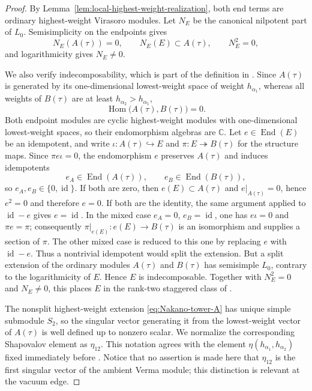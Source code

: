 \documentclass[12pt,leqno]{amsart}
\numberwithin{equation}{section}
\newcommand{\End}{\operatorname{End}}
\newcommand{\Hom}{\operatorname{Hom}}
\newcommand{\id}{\operatorname{id}}
\def\C{\mathbb{C}}
\begin{document}
\begin{proof}
By Lemma~\ref{lem:local-highest-weight-realization}, both end terms are
ordinary highest-weight Virasoro modules.  Let $N_E$ be the canonical
nilpotent part of $L_0$.  Semisimplicity on the endpoints gives
\[
 N_E(A(\tau))=0,\qquad
 N_E(E)\subset A(\tau),\qquad N_E^2=0,
\]
and logarithmicity gives $N_E\ne0$.

We also verify indecomposability, which is part of the definition in
\cite[Section~3]{KytolaRidout}.  Since $A(\tau)$ is generated by its
one-dimensional lowest-weight space of weight $h_{\alpha_1}$, whereas
all weights of $B(\tau)$ are at least $h_{\alpha_2}>h_{\alpha_1}$,
\[
 \Hom\bigl(A(\tau),B(\tau)\bigr)=0.
\]
Both endpoint modules are cyclic highest-weight modules with
one-dimensional lowest-weight spaces, so their endomorphism algebras are
$\C$.  Let $e\in\End(E)$ be an idempotent, and write
$\iota:A(\tau)\hookrightarrow E$ and
$\pi:E\twoheadrightarrow B(\tau)$ for the structure maps.  Since
$\pi e\iota=0$, the endomorphism $e$ preserves $A(\tau)$ and induces
idempotents
\[
 e_A\in\End(A(\tau)),\qquad e_B\in\End(B(\tau)),
\]
so $e_A,e_B\in\{0,\id\}$.  If both are zero, then
$e(E)\subset A(\tau)$ and $e|_{A(\tau)}=0$, hence $e^2=0$ and therefore
$e=0$.  If both are the identity, the same argument applied to $\id-e$
gives $e=\id$.  In the mixed case $e_A=0$, $e_B=\id$, one has
$e\iota=0$ and $\pi e=\pi$; consequently
$\pi|_{e(E)}:e(E)\to B(\tau)$ is an isomorphism and supplies a section of
$\pi$.  The other mixed case is reduced to this one by replacing $e$
with $\id-e$.  Thus a nontrivial idempotent would split the extension.
But a split extension of the ordinary modules $A(\tau)$ and $B(\tau)$
has semisimple $L_0$, contrary to the logarithmicity of $E$.  Hence $E$
is indecomposable.  Together with $N_E^2=0$ and $N_E\ne0$, this places
$E$ in the rank-two staggered class of \cite{KytolaRidout}.

The nonsplit highest-weight extension
\eqref{eq:Nakano-tower-A} has unique simple submodule $S_2$, so the
singular vector generating it from the lowest-weight vector of
$A(\tau)$ is well defined up to nonzero scalar.  We normalize the
corresponding Shapovalov element as $\eta_{12}$.  This notation agrees
with the element $\eta(h_{\alpha_1},h_{\alpha_2})$ fixed immediately
before \cite[Theorem~5.11]{Nakano}.  Notice that no assertion is made
here that $\eta_{12}$ is the first singular vector of the ambient Verma
module; this distinction is relevant at the vacuum edge.
\end{proof}
\end{document}
